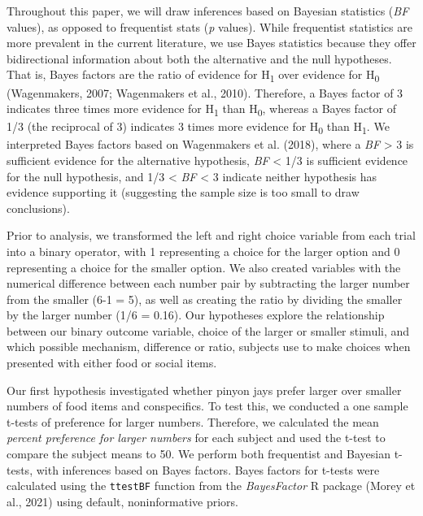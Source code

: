 \documentclass[
  ,doc,floatsintext]{apa6}
\begin{document}
Throughout this paper, we will draw inferences based on Bayesian statistics (\emph{BF} values), as opposed to frequentist stats (\emph{p} values). While frequentist statistics are more prevalent in the current literature, we use Bayes statistics because they offer bidirectional information about both the alternative and the null hypotheses. That is, Bayes factors are the ratio of evidence for H\textsubscript{1} over evidence for H\textsubscript{0} (Wagenmakers, 2007; Wagenmakers et al., 2010). Therefore, a Bayes factor of 3 indicates three times more evidence for H\textsubscript{1} than H\textsubscript{0}, whereas a Bayes factor of 1/3 (the reciprocal of 3) indicates 3 times more evidence for H\textsubscript{0} than H\textsubscript{1}. We interpreted Bayes factors based on Wagenmakers et al. (2018), where a \emph{BF} \textgreater{} 3 is sufficient evidence for the alternative hypothesis, \emph{BF} \textless{} 1/3 is sufficient evidence for the null hypothesis, and 1/3 \textless{} \emph{BF} \textless{} 3 indicate neither hypothesis has evidence supporting it (suggesting the sample size is too small to draw conclusions).

Prior to analysis, we transformed the left and right choice variable from each trial into a binary operator, with 1 representing a choice for the larger option and 0 representing a choice for the smaller option. We also created variables with the numerical difference between each number pair by subtracting the larger number from the smaller (6-1 = 5), as well as creating the ratio by dividing the smaller by the larger number (1/6 = 0.16). Our hypotheses explore the relationship between our binary outcome variable, choice of the larger or smaller stimuli, and which possible mechanism, difference or ratio, subjects use to make choices when presented with either food or social items.

Our first hypothesis investigated whether pinyon jays prefer larger over smaller numbers of food items and conspecifics. To test this, we conducted a one sample t-tests of preference for larger numbers. Therefore, we calculated the mean \emph{percent preference for larger numbers} for each subject and used the t-test to compare the subject means to 50. We perform both frequentist and Bayesian t-tests, with inferences based on Bayes factors. Bayes factors for t-tests were calculated using the \texttt{ttestBF} function from the \emph{BayesFactor} R package (Morey et al., 2021) using default, noninformative priors.
\end{document}
